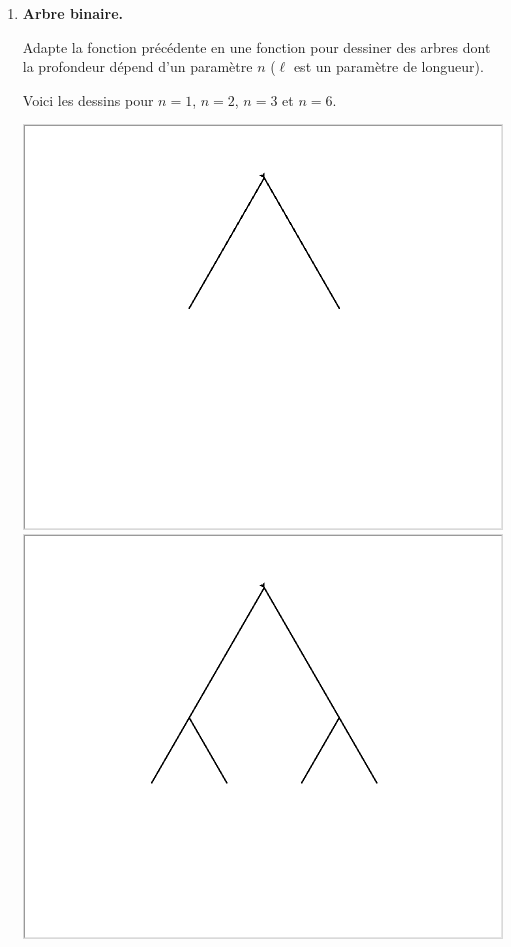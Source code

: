 \documentclass[11pt,class=report,crop=false]{standalone}
\begin{document}
\begin{activite}
\begin{enumerate}
  \item  \textbf{Arbre binaire.} 
  
  Adapte la fonction précédente en une fonction  pour dessiner des arbres dont la profondeur dépend d'un paramètre $n$ ($\ell$ est un paramètre de longueur).
  
  Voici les dessins pour $n=1$, $n=2$, $n=3$ et $n=6$.
  
  \begin{center}
\includegraphics[scale=\myscale,scale=0.14]{ecran_tortue_arbre1}\quad 
\includegraphics[scale=\myscale,scale=0.14]{ecran_tortue_arbre2}\quad

\end{center}
\end{enumerate}
\end{activite}
\end{document}
